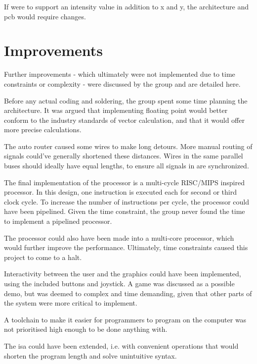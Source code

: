 If \vthreek were to support an intensity value in addition to x and y, the architecture and \gls{pcb} would require changes.

\section{Improvements}
Further improvements - which ultimately were not implemented due to time constraints or complexity - were discussed by the group and are detailed here.

Before any actual coding and soldering, the group spent some time planning the architecture. It was argued that implementing floating point would better conform to the industry standards of vector calculation, and that it would offer more precise calculations.

The auto router caused some wires to make long detours. 
More manual routing of signals could've generally shortened these distances. 
Wires in the same parallel buses should ideally have equal lengths, to ensure all signals in are synchronized. 

The final implementation of the processor is a multi-cycle RISC/MIPS inspired processor.
In this design, one instruction is executed each for second or third clock cycle.
To increase the number of instructions per cycle, the processor could have been pipelined.
Given the time constraint, the group never found the time to implement a pipelined processor.

The processor could also have been made into a multi-core processor, which would further improve the performance. Ultimately, time constraints caused this project to come to a halt.

Interactivity between the user and the graphics could have been implemented, using the included buttons and joystick. A game was discussed as a possible demo, but was deemed to complex and time demanding, given that other parts of the system were more critical to implement.

A toolchain to make it easier for programmers to program on the computer was not prioritised high enough to be done anything with.

The \gls{isa} could have been extended, i.e. with convenient operations that would shorten the program length and solve unintuitive syntax.

